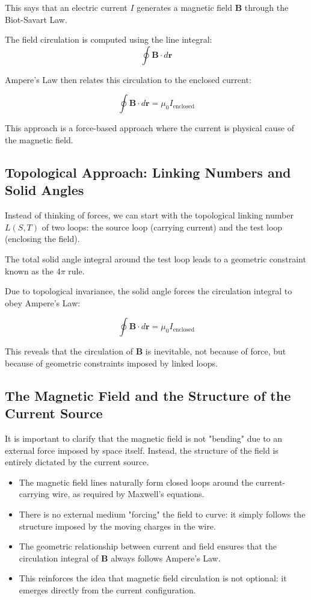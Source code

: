 \documentclass{article}
\begin{document}
This says that an electric current \( I \) generates a magnetic field \( \mathbf{B} \) through the Biot-Savart Law.

The field circulation is computed using the line integral:
    \[
    \oint \mathbf{B} \cdot d\mathbf{r}
    \]

Ampere’s Law then relates this circulation to the enclosed current:

    \[
    \oint \mathbf{B} \cdot d\mathbf{r} = \mu_0 I_{\text{enclosed}}
    \]

This approach is a force-based approach where the current is physical cause of the magnetic field.

\subsection{Topological Approach: Linking Numbers and Solid Angles}

Instead of thinking of forces, we can start with the topological linking number \( L(S,T) \) of two loops: the source loop (carrying current) and the test loop (enclosing the field).

The total solid angle integral around the test loop leads to a geometric constraint known as the \( 4\pi \) rule.

Due to topological invariance, the solid angle forces the circulation integral to obey Ampere’s Law:

    \[
    \oint \mathbf{B} \cdot d\mathbf{r} = \mu_0 I_{\text{enclosed}}
    \]

This reveals that the circulation of \( \mathbf{B} \) is inevitable, not because of force, but because of geometric constraints imposed by linked loops.

\subsection{The Magnetic Field and the Structure of the Current Source}

It is important to clarify that the magnetic field is not "bending" due to an external force imposed by space itself. Instead, the structure of the field is entirely dictated by the current source. 

\begin{itemize}
    \item The magnetic field lines naturally form closed loops around the current-carrying wire, as required by Maxwell's equations.
    \item There is no external medium "forcing" the field to curve: it simply follows the structure imposed by the moving charges in the wire.
    \item The geometric relationship between current and field ensures that the circulation integral of \( \mathbf{B} \) always follows Ampere’s Law.
    \item This reinforces the idea that magnetic field circulation is not optional: it emerges directly from the current configuration.
\end{itemize}
\end{document}

